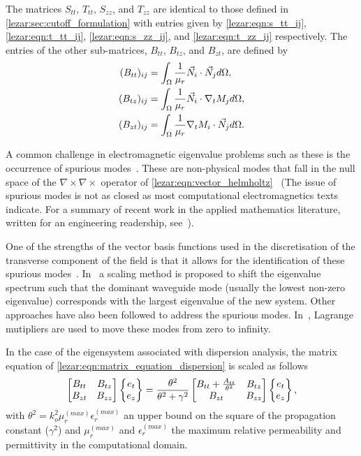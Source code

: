 The matrices $S_{tt}$, $T_{tt}$, $S_{zz}$, and $T_{zz}$ are identical
to those defined in \ref{lezar:sec:cutoff_formulation} with entries given by
\eqref{lezar:eqn:s_tt_ij}, \eqref{lezar:eqn:t_tt_ij}, \eqref{lezar:eqn:s_zz_ij}, and \eqref{lezar:eqn:t_zz_ij} respectively.
The entries of the other sub-matrices, $B_{tt}$, $B_{tz}$, and
$B_{zt}$, are defined by
\begin{align}
(B_{tt})_{ij} &=
\int_{\Omega}{\frac{1}{\mu_r}\vec{N}_i\cdot\vec{N}_j}{d\Omega},\\
(B_{tz})_{ij} &=
\int_{\Omega}{\frac{1}{\mu_r}\vec{N}_i\cdot\nabla_t{M_j}}{d\Omega},\\
(B_{zt})_{ij} &=
\int_{\Omega}{\frac{1}{\mu_r}\nabla_t{M_i}\cdot\vec{N}_j}{d\Omega}.
\end{align}

A common challenge in electromagnetic eigenvalue problems such as
these is the occurrence of spurious
modes~\cite{Davidson2005}.  These are non-physical
modes that fall in the null space of the $\nabla\times{\nabla\times}$ operator
of \eqref{lezar:eqn:vector_helmholtz}~\cite{Bossavit1998} (The issue of spurious
modes is not as closed as most computational electromagnetics texts
indicate. For a summary of recent work in the applied mathematics
literature, written for an engineering readership,
see~\cite{FernandesRaffetto2002}).

One of the strengths of the vector basis functions used in the
discretisation of the transverse component of the field is that it
allows for the identification of these spurious modes~\cite{Davidson2005,
Jin2002}.  In~\cite{LeeSunCendes1991} a scaling method is proposed to shift
the eigenvalue spectrum such that the dominant waveguide mode (usually
the lowest non-zero eigenvalue) corresponds with the largest
eigenvalue of the new system. Other approaches have also been followed
to address the spurious modes. In~\cite{VardapetyanDemkowicz2002}, Lagrange
mutipliers are used to move these modes from zero to infinity.

In the case of the eigensystem associated with dispersion analysis,
the matrix equation of \eqref{lezar:eqn:matrix_equation_dispersion} is
scaled as follows
\begin{equation}
    \label{lezar:eqn:matrix_equation_dispersion_scaled}
    \begin{bmatrix} B_{tt} & B_{tz}\\B_{zt} & B_{zz}\end{bmatrix}\begin{Bmatrix}e_t\\e_z\end{Bmatrix} =
    \frac{\theta^2}{\theta^2 +
    \gamma^2}\begin{bmatrix} B_{tt} +
    \frac{A_{tt}}{\theta^2} & B_{tz}\\B_{zt} & B_{zz}\end{bmatrix}\begin{Bmatrix}e_t\\e_z\end{Bmatrix},
\end{equation}
with $\theta^2 = k_o^2\mu_r^{(max)}\epsilon_r^{(max)}$ an upper bound on
the square of the propagation constant ($\gamma^2$) and $\mu_r^{(max)}$
and $\epsilon_r^{(max)}$ the maximum relative permeability and permittivity
in the computational domain.

